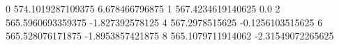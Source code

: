 0 574.1019287109375 6.678466796875
1 567.4234619140625 0.0
2 565.5960693359375 -1.827392578125
4 567.2978515625 -0.1256103515625
6 565.528076171875 -1.8953857421875
8 565.1079711914062 -2.31549072265625
